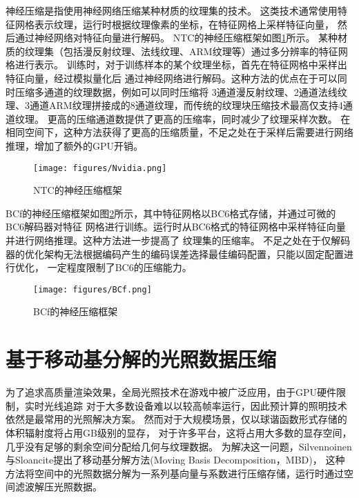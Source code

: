 神经压缩是指使用神经网络压缩某种材质的纹理集的技术。
这类技术通常使用特征网格表示纹理，运行时根据纹理像素的坐标，在特征网格上采样特征向量，
然后通过神经网络对特征向量进行解码。
NTC\cite{vaidyanathan2023random}的神经压缩框架如图\ref{fig:Nvidia}所示。
某种材质的纹理集（包括漫反射纹理、法线纹理、ARM纹理等）通过多分辨率的特征网格进行表示。
训练时，对于训练样本的某个纹理坐标，首先在特征网格中采样出特征向量，经过模拟量化后
通过神经网络进行解码。这种方法的优点在于可以同时压缩多通道的纹理数据，例如可以同时压缩将
3通道漫反射纹理、2通道法线纹理、3通道ARM纹理拼接成的8通道纹理，而传统的纹理块压缩技术最高仅支持4通道纹理。
更高的压缩通道数提供了更高的压缩率，同时减少了纹理采样次数。
在相同空间下，这种方法获得了更高的压缩质量，不足之处在于采样后需要进行网络推理，增加了额外的GPU开销。

\begin{figure}[htbp]
    \centering
    \texttt{[image: figures/Nvidia.png]}
    \caption{NTC的神经压缩框架\cite{vaidyanathan2023random}}
    \label{fig:Nvidia}
\end{figure}

BCf\cite{weinreich2024real}的神经压缩框架如图\ref{fig:BCf}所示，其中特征网格以BC6格式存储，并通过可微的BC6解码器对特征
网格进行训练。运行时从BC6格式的特征网格中采样特征向量并进行网络推理。这种方法进一步提高了
纹理集的压缩率。
不足之处在于仅解码器的优化架构无法根据编码产生的编码误差选择最佳编码配置，只能以固定配置进行优化，
一定程度限制了BC6的压缩能力。

\begin{figure}[htbp]
    \centering
    \texttt{[image: figures/BCf.png]}
    \caption{BCf的神经压缩框架\cite{weinreich2024real}}
    \label{fig:BCf}
\end{figure}


\section{基于移动基分解的光照数据压缩}

为了追求高质量渲染效果，全局光照技术在游戏中被广泛应用，由于GPU硬件限制，实时光线追踪
对于大多数设备难以以较高帧率运行，因此预计算的照明技术依然是最常用的光照解决方案。
然而对于大规模场景，仅以球谐函数形式存储的体积辐射度将占用GB级别的显存\cite{silvennoinen2021moving}，
对于许多平台，这将占用大多数的显存空间，几乎没有足够的剩余空间分配给几何与纹理数据。
为解决这一问题，Silvennoinen与Sloancite\cite{silvennoinen2021moving}提出了移动基分解方法(Moving Basis Decomposition，MBD)，
这种方法将空间中的光照数据分解为一系列基向量与系数进行压缩存储，运行时通过空间滤波解压光照数据。

